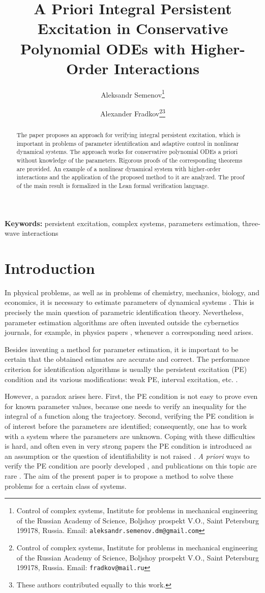 \documentclass[11pt]{article}
\title{A Priori Integral Persistent Excitation in Conservative Polynomial ODEs with Higher-Order Interactions}
\author{Aleksandr Semenov\thanks{Control of complex systems, Institute for problems in mechanical engineering of the Russian Academy of Science, Boljshoy prospekt V.O., Saint Petersburg 199178, Russia. Email: \texttt{aleksandr.semenov.dm@gmail.com}}
\and Alexander Fradkov\thanks{Control of complex systems, Institute for problems in mechanical engineering of the Russian Academy of Science, Boljshoy prospekt V.O., Saint Petersburg 199178, Russia. Email: \texttt{fradkov@mail.ru}}\thanks{These authors contributed equally to this work.}}
\date{}
\theoremstyle{thmstyleone}
\theoremstyle{thmstyletwo}
\theoremstyle{thmstylethree}
\begin{document}
\maketitle

\begin{abstract}
The paper proposes an approach for verifying integral persistent excitation, which is important in problems of parameter identification and adaptive control in nonlinear dynamical systems. The approach works for conservative polynomial ODEs a priori without knowledge of the parameters. Rigorous proofs of the corresponding theorems are provided. An example of a nonlinear dynamical system with higher-order interactions and the application of the proposed method to it are analyzed. The proof of the main result is formalized in the Lean formal verification language.
\end{abstract}

\noindent\textbf{Keywords:} persistent excitation, complex systems, parameters estimation, three-wave interactions

\section{Introduction}

In physical problems, as well as in problems of chemistry, mechanics, biology, and economics, it is necessary to estimate parameters of dynamical systems \cite{FradkovMiroshnikNikiforov1999}. This is precisely the main question of parametric identification theory. Nevertheless, parameter estimation algorithms are often invented outside the cybernetics journals, for example, in physics papers \cite{KralemannCimponeriuRosenblumPikovskyMrowka2007,GoelMaitraMontroll1971}, whenever a corresponding need arises.

Besides inventing a method for parameter estimation, it is important to be certain that the obtained estimates are accurate and correct. The performance criterion for identification algorithms is usually the persistent excitation (PE) condition and its various modifications: weak PE, interval excitation, etc. \cite{WangEfimovBobtsov2020,NarendraAnnaswamy1987,PanteleyLoriaTeel2001,AeyelsSepulchre1994}.

However, a paradox arises here. First, the PE condition is not easy to prove even for known parameter values, because one needs to verify an inequality for the integral of a function along the trajectory. Second, verifying the PE condition is of interest before the parameters are identified; consequently, one has to work with a system where the parameters are unknown. Coping with these difficulties is hard, and often even in very strong papers the PE condition is introduced as an assumption \cite{RybalkoFradkov2023,XingNaCostaCastelloGao2020,KralemannCimponeriuRosenblumPikovskyMrowka2008} or the question of identifiability is not raised \cite{KralemannCimponeriuRosenblumPikovskyMrowka2007}. \emph{A priori} ways to verify the PE condition are poorly developed \cite{PadoanScarciottiAstolfi2017}, and publications on this topic are rare \cite{PadoanScarciottiAstolfi2017,SemenovFradkov2024,SemenovFradkov2025}. The aim of the present paper is to propose a method to solve these problems for a certain class of systems.
\end{document}
